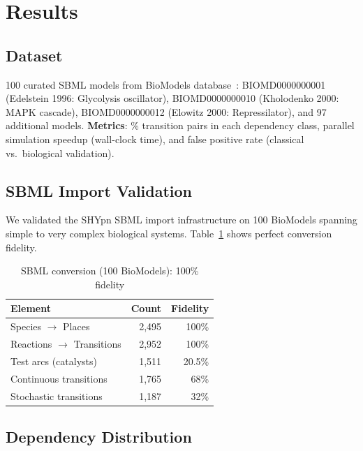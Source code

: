 \documentclass[twocolumn,11pt]{article}
\begin{document}
\section{Results}

\subsection{Dataset}

100 curated SBML models from BioModels database~\cite{Malik-Sheriff2020}: BIOMD0000000001 (Edelstein 1996: Glycolysis oscillator), BIOMD0000000010 (Kholodenko 2000: MAPK cascade), BIOMD0000000012 (Elowitz 2000: Repressilator), and 97 additional models.
\textbf{Metrics}: \% transition pairs in each dependency class, parallel simulation speedup (wall-clock time), and false positive rate (classical vs.\ biological validation).

\subsection{SBML Import Validation}

We validated the SHYpn SBML import infrastructure on 100 BioModels spanning simple to very complex biological systems. Table~\ref{tab:sbml-import-real} shows perfect conversion fidelity.

\begin{table}[htbp]
\small
\caption{SBML conversion (100 BioModels): 100\% fidelity}
\label{tab:sbml-import-real}
\vspace{-6pt}
\begin{tabular*}{\columnwidth}{@{\extracolsep{\fill}}lrr@{}}
\toprule
\textbf{Element} & \textbf{Count} & \textbf{Fidelity} \\
\midrule
Species $\to$ Places & 2,495 & 100\% \\
Reactions $\to$ Transitions & 2,952 & 100\% \\
Test arcs (catalysts) & 1,511 & 20.5\% \\
Continuous transitions & 1,765 & 68\% \\
Stochastic transitions & 1,187 & 32\% \\
\bottomrule
\end{tabular*}
\vspace{-8pt}
\end{table}

\subsection{Dependency Distribution}
\end{document}
